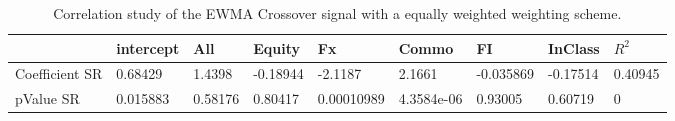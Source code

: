 \begin{table}[H]
\centering
\begin{tabular}{lllllllll}
\hline& intercept & All & Equity & Fx & Commo & FI & InClass & $R^{2}$ \\ 
\hline 
Coefficient SR & 0.68429 & 1.4398 & -0.18944 & -2.1187 & 2.1661 & -0.035869 & -0.17514 & 0.40945 \\ 
pValue SR & 0.015883 & 0.58176 & 0.80417 & 0.00010989 & 4.3584e-06 & 0.93005 & 0.60719 & 0 \\ 
\hline
\end{tabular}
\caption{Correlation study of the EWMA Crossover signal with a equally weighted weighting scheme.}
\label{MBBSEWOQ_CORR}
\end{table}